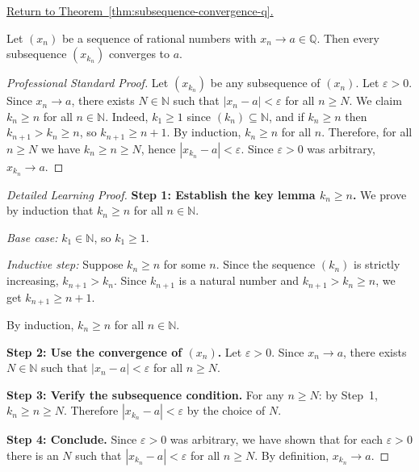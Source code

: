 
\newpage
{}
\label{prf:subsequence-convergence-q}

\begin{remark*}[Return]
\hyperref[thm:subsequence-convergence-q]{Return to Theorem~\ref*{thm:subsequence-convergence-q}.}
\end{remark*}

\begin{theorem*}
Let $(x_n)$ be a sequence of rational numbers with $x_n \to a \in \mathbb{Q}$.
Then every subsequence $(x_{k_n})$ converges to $a$.
\end{theorem*}

\begin{proof}[Professional Standard Proof]
\LRAProofBodyStart
Let $(x_{k_n})$ be any subsequence of $(x_n)$.  Let $\varepsilon > 0$.
Since $x_n \to a$, there exists $N \in \mathbb{N}$ such that
$|x_n - a| < \varepsilon$ for all $n \geq N$.
We claim $k_n \geq n$ for all $n \in \mathbb{N}$.
Indeed, $k_1 \geq 1$ since $(k_n) \subseteq \mathbb{N}$, and if
$k_n \geq n$ then $k_{n+1} > k_n \geq n$, so $k_{n+1} \geq n+1$.
By induction, $k_n \geq n$ for all $n$.
Therefore, for all $n \geq N$ we have $k_n \geq n \geq N$, hence
$|x_{k_n} - a| < \varepsilon$.
Since $\varepsilon > 0$ was arbitrary, $x_{k_n} \to a$.
\end{proof}

\begin{proof}[Detailed Learning Proof]
\LRAProofBodyStart
\textbf{Step 1: Establish the key lemma $k_n \geq n$.}
We prove by induction that $k_n \geq n$ for all $n \in \mathbb{N}$.

\emph{Base case:} $k_1 \in \mathbb{N}$, so $k_1 \geq 1$.

\emph{Inductive step:} Suppose $k_n \geq n$ for some $n$.
Since the sequence $(k_n)$ is strictly increasing, $k_{n+1} > k_n$.
Since $k_{n+1}$ is a natural number and $k_{n+1} > k_n \geq n$,
we get $k_{n+1} \geq n + 1$.

By induction, $k_n \geq n$ for all $n \in \mathbb{N}$.

\textbf{Step 2: Use the convergence of $(x_n)$.}
Let $\varepsilon > 0$.  Since $x_n \to a$, there exists $N \in \mathbb{N}$
such that $|x_n - a| < \varepsilon$ for all $n \geq N$.

\textbf{Step 3: Verify the subsequence condition.}
For any $n \geq N$: by Step~1, $k_n \geq n \geq N$.
Therefore $|x_{k_n} - a| < \varepsilon$ by the choice of $N$.

\textbf{Step 4: Conclude.}
Since $\varepsilon > 0$ was arbitrary, we have shown that for each
$\varepsilon > 0$ there is an $N$ such that $|x_{k_n} - a| < \varepsilon$
for all $n \geq N$.  By definition, $x_{k_n} \to a$.
\end{proof}

